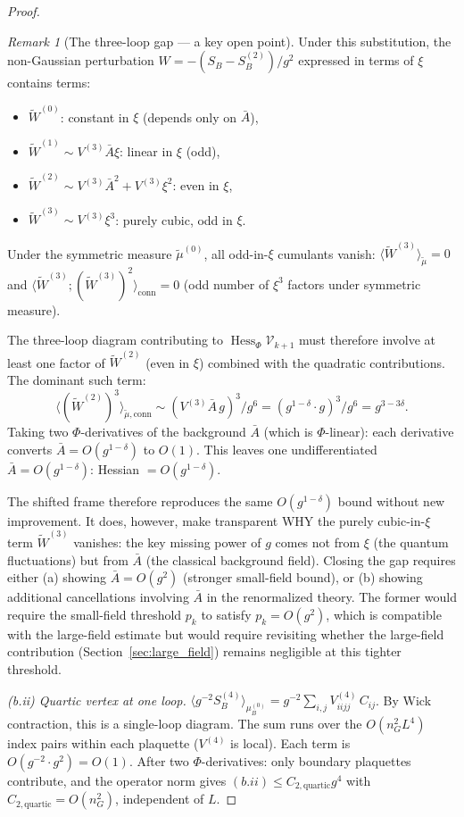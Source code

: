 \documentclass[11pt,a4paper]{article}
\theoremstyle{plain}
\theoremstyle{definition}
\theoremstyle{remark}
\newtheorem{remark}[theorem]{Remark}
\newcommand{\Hess}{\operatorname{Hess}}
\newcommand{\cV}{\mathcal{V}}
\begin{document}
\begin{proof}
\begin{remark}[The three-loop gap --- a key open point]
Under this substitution, the non-Gaussian perturbation
$W = -(S_B - S_B^{(2)})/g^2$ expressed in terms of $\xi$
contains terms:
\begin{itemize}[nosep]
  \item $\tilde W^{(0)}$: constant in $\xi$ (depends only on $\bar A$),
  \item $\tilde W^{(1)} \sim V^{(3)}\bar A \xi$: linear in $\xi$ (odd),
  \item $\tilde W^{(2)} \sim V^{(3)}\bar A^2 + V^{(3)}\xi^2$: even in $\xi$,
  \item $\tilde W^{(3)} \sim V^{(3)}\xi^3$: purely cubic, odd in $\xi$.
\end{itemize}
Under the symmetric measure $\tilde\mu^{(0)}$, all
odd-in-$\xi$ cumulants vanish:
$\langle \tilde W^{(3)}\rangle_{\tilde\mu} = 0$ and
$\langle \tilde W^{(3)};(\tilde W^{(3)})^2\rangle_{\mathrm{conn}} = 0$
(odd number of $\xi^3$ factors under symmetric measure).

The three-loop diagram contributing to
$\Hess_\Phi\cV_{k+1}$ must therefore involve at least
one factor of $\tilde W^{(2)}$ (even in $\xi$) combined
with the quadratic contributions. The dominant such term:
\[
  \langle (\tilde W^{(2)})^3\rangle_{\tilde\mu,\mathrm{conn}}
  \sim (V^{(3)}\bar A\,g)^3/g^6
  = (g^{1-\delta} \cdot g)^3/g^6
  = g^{3-3\delta}.
\]
Taking two $\Phi$-derivatives of the background
$\bar A$ (which is $\Phi$-linear): each derivative
converts $\bar A = O(g^{1-\delta})$ to $O(1)$.
This leaves one undifferentiated $\bar A = O(g^{1-\delta})$:
Hessian $= O(g^{1-\delta})$.

The shifted frame therefore reproduces the same $O(g^{1-\delta})$
bound without new improvement. It does, however, make
transparent WHY the purely cubic-in-$\xi$ term $\tilde W^{(3)}$
vanishes: the key missing power of $g$ comes not from
$\xi$ (the quantum fluctuations) but from $\bar A$ (the
classical background field). Closing the gap requires either
(a) showing $\bar A = O(g^2)$ (stronger small-field bound),
or (b) showing additional cancellations involving
$\bar A$ in the renormalized theory.
The former would require the small-field threshold $p_k$
to satisfy $p_k = O(g^2)$, which is compatible with the
large-field estimate but would require revisiting whether
the large-field contribution (Section~\ref{sec:large_field})
remains negligible at this tighter threshold.

\end{remark}

\textit{(b.ii) Quartic vertex at one loop.}
$\langle g^{-2}S_B^{(4)}\rangle_{\mu_B^{(0)}}
= g^{-2}\sum_{i,j} V^{(4)}_{iijj}\,C_{ij}$. By Wick
contraction, this is a single-loop diagram. The sum
runs over the $O(n_G^2 L^4)$ index pairs within each
plaquette ($V^{(4)}$ is local). Each term is
$O(g^{-2} \cdot g^2) = O(1)$. After two
$\Phi$-derivatives: only boundary plaquettes contribute,
and the operator norm gives
$(b.ii) \le C_{2,\mathrm{quartic}} g^4$
with $C_{2,\mathrm{quartic}} = O(n_G^2)$, independent
of $L$.


\end{proof}
\end{document}
